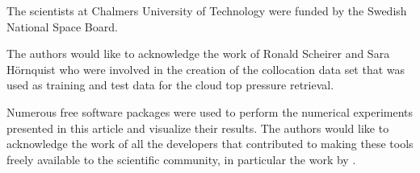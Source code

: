 \documentclass[journal abbreviation, manuscript]{copernicus}
\begin{document}


\begin{acknowledgements}
The scientists at Chalmers University of Technology were funded by the Swedish National Space Board.

The authors would like to acknowledge the work of Ronald Scheirer and Sara
Hörnquist who were involved in the creation of the collocation data set that was
used as training and test data for the cloud top pressure retrieval.

Numerous free software packages were used to perform the numerical experiments
presented in this article and visualize their results. The authors would like to
acknowledge the work of all the developers that contributed to making these tools
freely available to the scientific community, in particular the work by
\citet{matplotlib, ipython, numpy, python}.
\end{acknowledgements}















\end{document}
